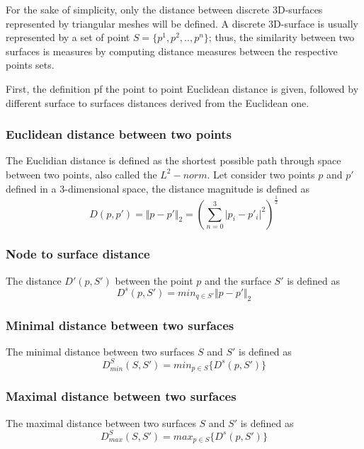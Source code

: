 For the sake of simplicity, only the distance between discrete 3D-surfaces represented by triangular meshes will be defined. A discrete 3D-surface is usually represented by a set of point $S = \lbrace p^1, p^2, ..,p^n \rbrace$; thus, the similarity between two surfaces is measures by computing distance measures between the respective points sets.  

 First, the definition pf the point to point Euclidean distance is given, followed by different surface to surfaces distances derived from the Euclidean one.

\subsubsection*{Euclidean distance between two points}
The Euclidian distance is defined as the shortest possible path through space between two points, also called the $L^2-norm$.  Let consider two points $p$ and $p'$ defined in a 3-dimensional space, the distance magnitude is defined as 
\begin{equation}
D(p,p') =\Vert p-p' \Vert_2  =(\sum_{n=0}^{3} \vert p_i - p'_i \vert^2)^{\frac{1}{2}}
\end{equation}
\subsubsection*{Node to surface distance}
The distance $D'(p, S')$ between the point $p$ and the surface $S'$ is defined as
\begin{equation}
D^s(p,S') = min_{q \in S'} \Vert p-p'\Vert_2
\end{equation}
\subsubsection*{Minimal distance between two surfaces}
The minimal distance between two surfaces $S$ and $S'$ is defined as 
\begin{equation}
D^S_{min}(S, S') =  min_{p \in S} \lbrace D^s(p, S') \rbrace
\end{equation}
\subsubsection*{Maximal distance between two surfaces}
The maximal distance between two surfaces $S$ and $S'$ is defined as 
\begin{equation}
D^S_{max}(S, S') =  max_{p \in S} \lbrace D^s(p, S')\rbrace
\end{equation}

